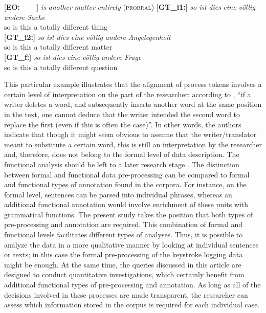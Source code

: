 \documentclass[output=paper]{LSP/langsci}
\begin{document}
\newpage
\ea \label{ex:1:10}
\begin{xlist}
\exi{}[\textbf{EO:~~~~}]{ \emph{is} \emph{another} \emph{matter} \emph{entirely} (\textsc{probral})}
\exi{}[\textbf{GT\_i1:}]{
\gll   \emph{so} \emph{ist} \emph{dies} \emph{eine} \emph{völlig} \emph{andere} \emph{Sache}\\
 so is this a totally different thing\\
 }
 \exi{}[\textbf{GT\_i2:}]{
\gll \emph{so} \emph{ist} \emph{dies} \emph{eine} \emph{völlig} \emph{andere} \emph{Angelegenheit} \\
 so is this a totally different matter\\
 }
 \exi{}[\textbf{GT\_f:}]{
\gll \emph{so} \emph{ist} \emph{dies} \emph{eine} \emph{völlig} \emph{andere} \emph{Frage} \\
 so is this a totally different question\\
 }
\end{xlist}
\z

This particular example illustrates that the alignment of process tokens involves a certain level of interpretation on the part of the researcher: according to \citet[92]{Kollberg2001}, “if a writer deletes a word, and subsequently inserts another word at the same position in the text, one cannot deduce that the writer intended the second word to replace the first (even if this is often the case)”. In other words, the authors indicate that though it might seem obvious to assume that the writer/translator meant to substitute a certain word, this is still an interpretation by the researcher and, therefore, does not belong to the formal level of data description. The functional analysis should be left to a later research stage \citep[92--93]{Kollberg2001}. The distinction between formal and functional data pre-processing can be compared to formal and functional types of annotation found in the corpora. For instance, on the formal level, sentences can be parsed into individual phrases, whereas an additional functional annotation would involve enrichment of these units with grammatical functions. The present study takes the position that both types of pre-processing and annotation are required. This combination of formal and functional levels facilitates different types of analyses. Thus, it is possible to analyze the data in a more qualitative manner by looking at individual sentences or texts; in this case the formal pre-processing of the keystroke logging data might be enough. At the same time, the queries discussed in this article are designed to conduct quantitative investigations, which certainly benefit from additional functional types of pre-processing and annotation. As long as all of the decisions involved in these processes are made transparent, the researcher can assess which information stored in the corpus is required for each individual case. 
\end{document}
